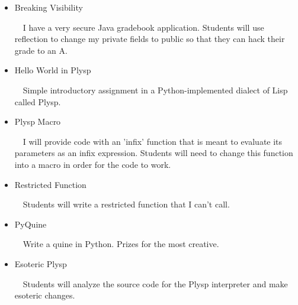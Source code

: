 \documentclass[11pt]{article}
\begin{document}
\begin{itemize}
\item Breaking Visibility 

$\ \ \ $ I have a very secure Java gradebook application. Students will use reflection to change my private fields to public so that they can hack their grade to an A.

\item Hello World in Plysp

$\ \ \ $ Simple introductory assignment in a Python-implemented dialect of Lisp called Plysp.

\item Plysp Macro

$\ \ \ $ I will provide code with an 'infix' function that is meant to evaluate its parameters as an infix expression. Students will need to change this function into a macro in order for the code to work.

\item Restricted Function

$\ \ \ $ Students will write a restricted function that I can't call.

\item PyQuine

$\ \ \ $ Write a quine in Python. Prizes for the most creative.

\item Esoteric Plysp

$\ \ \ $ Students will analyze the source code for the Plysp interpreter and make esoteric changes.

\end{itemize}
\end{document}
